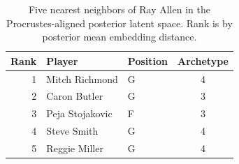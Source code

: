 \begin{table}[htbp]
  \centering\small
  \begin{tabular}{rllc}
    \toprule
    Rank & Player & Position & Archetype \\
    \midrule
    1 & Mitch Richmond & G & 4 \\
    2 & Caron Butler & G & 3 \\
    3 & Peja Stojakovic & F & 3 \\
    4 & Steve Smith & G & 4 \\
    5 & Reggie Miller & G & 4 \\
    \bottomrule
  \end{tabular}
  \caption{Five nearest neighbors of Ray Allen in the Procrustes-aligned posterior latent space. Rank is by posterior mean embedding distance.}
  \label{tab:Ray_Allen_neighbors}
\end{table}

